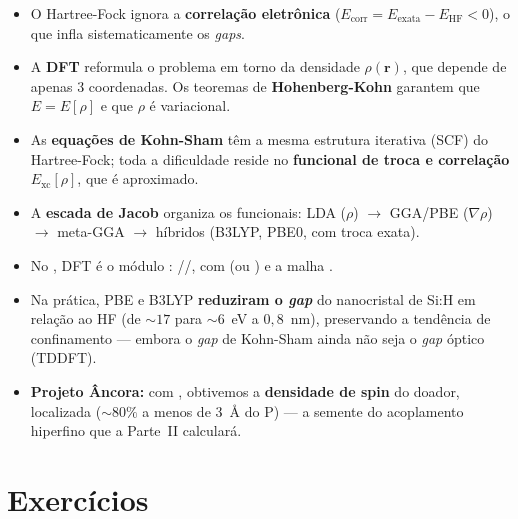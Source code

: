 \begin{itemize}[leftmargin=*]
  \item O Hartree-Fock ignora a \textbf{correlação eletrônica}
        ($E_{\text{corr}} = E_{\text{exata}} - E_{\text{HF}} < 0$), o que infla
        sistematicamente os \emph{gaps}.
  \item A \textbf{DFT} reformula o problema em torno da densidade
        $\rho(\mathbf{r})$, que depende de apenas 3 coordenadas. Os teoremas de
        \textbf{Hohenberg-Kohn} garantem que $E = E[\rho]$ e que $\rho$ é
        variacional.
  \item As \textbf{equações de Kohn-Sham} têm a mesma estrutura iterativa (SCF) do
        Hartree-Fock; toda a dificuldade reside no \textbf{funcional de troca e
        correlação} $E_{\text{xc}}[\rho]$, que é aproximado.
  \item A \textbf{escada de Jacob} organiza os funcionais: LDA
        ($\rho$) $\to$ GGA/PBE ($\nabla\rho$) $\to$ meta-GGA $\to$ híbridos
        (B3LYP, PBE0, com troca exata).
  \item No \pyscf{}, DFT é o módulo : //,
        com  (ou ) e a malha .
  \item Na prática, PBE e B3LYP \textbf{reduziram o \emph{gap}} do nanocristal de
        Si:H em relação ao HF (de $\sim\!17$ para $\sim\!6$~eV a $0{,}8$~nm),
        preservando a tendência de confinamento --- embora o \emph{gap} de
        Kohn-Sham ainda não seja o \emph{gap} óptico (TDDFT).
  \item \textbf{Projeto Âncora:} com , obtivemos a \textbf{densidade
        de spin} do doador, localizada ($\sim\!80\%$ a menos de $3$~Å do P) --- a
        semente do acoplamento hiperfino que a Parte~II calculará.
\end{itemize}

\section*{Exercícios}


